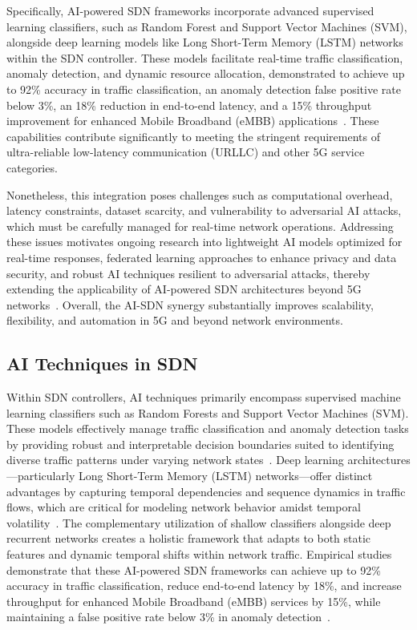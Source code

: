 \documentclass[sigconf]{acmart}
\begin{document}
Specifically, AI-powered SDN frameworks incorporate advanced supervised learning classifiers, such as Random Forest and Support Vector Machines (SVM), alongside deep learning models like Long Short-Term Memory (LSTM) networks within the SDN controller. These models facilitate real-time traffic classification, anomaly detection, and dynamic resource allocation, demonstrated to achieve up to 92\% accuracy in traffic classification, an anomaly detection false positive rate below 3\%, an 18\% reduction in end-to-end latency, and a 15\% throughput improvement for enhanced Mobile Broadband (eMBB) applications~\cite{ref52}. These capabilities contribute significantly to meeting the stringent requirements of ultra-reliable low-latency communication (URLLC) and other 5G service categories.

Nonetheless, this integration poses challenges such as computational overhead, latency constraints, dataset scarcity, and vulnerability to adversarial AI attacks, which must be carefully managed for real-time network operations. Addressing these issues motivates ongoing research into lightweight AI models optimized for real-time responses, federated learning approaches to enhance privacy and data security, and robust AI techniques resilient to adversarial attacks, thereby extending the applicability of AI-powered SDN architectures beyond 5G networks~\cite{ref52}. Overall, the AI-SDN synergy substantially improves scalability, flexibility, and automation in 5G and beyond network environments.

\subsection{AI Techniques in SDN}

Within SDN controllers, AI techniques primarily encompass supervised machine learning classifiers such as Random Forests and Support Vector Machines (SVM). These models effectively manage traffic classification and anomaly detection tasks by providing robust and interpretable decision boundaries suited to identifying diverse traffic patterns under varying network states~\cite{ref52}. Deep learning architectures—particularly Long Short-Term Memory (LSTM) networks—offer distinct advantages by capturing temporal dependencies and sequence dynamics in traffic flows, which are critical for modeling network behavior amidst temporal volatility~\cite{ref52}. The complementary utilization of shallow classifiers alongside deep recurrent networks creates a holistic framework that adapts to both static features and dynamic temporal shifts within network traffic. Empirical studies demonstrate that these AI-powered SDN frameworks can achieve up to 92\% accuracy in traffic classification, reduce end-to-end latency by 18\%, and increase throughput for enhanced Mobile Broadband (eMBB) services by 15\%, while maintaining a false positive rate below 3\% in anomaly detection~\cite{ref52}. 
\end{document}
